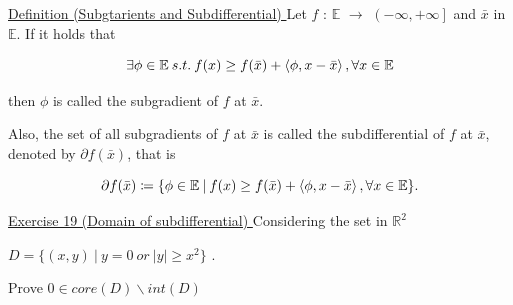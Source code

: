 \documentclass[a4paper,11pt]{jsarticle}
\begin{document}
\begin{itembox}[l]{\underline{Definition (Subgtarients and Subdifferential) }}
  Let $f$ : $\mathbb{E}$ $\to$ $ \left ( -\infty ,+\infty \right ] $ and $\bar{x}$ in $\mathbb{E}$. If it holds that

  \begin{equation}
    \exists \phi \in \mathbb{E} \:s.t.\: f(x) \geq f(\bar{x}) + \left\langle \phi, x-\bar{x} \right\rangle, \forall x \in \mathbb{E} \notag
  \end{equation}

  then $\phi$ is called the subgradient of $f$ at $\bar{x}$.

  Also, the set of all subgradients of $f$ at $\bar{x}$ is called the subdifferential of $f$ at $\bar{x}$, denoted by $\partial f(\bar{x})$, that is

  \begin{equation}
    \partial f(\bar{x}) \coloneqq \{\phi \in \mathbb{E}\:|\:f(x) \geq f(\bar{x}) + \left\langle \phi, x-\bar{x} \right\rangle, \forall x \in \mathbb{E} \}. \notag
  \end{equation}
\end{itembox}

\begin{itembox}[l]{\underline{Exercise 19 (Domain of subdifferential) }}
  Considering the set in $\mathbb{R}^2$

  \begin{center}
    $D=\{(x,y) \:|\: y = 0 \:or\: |y| \geq x^2 \}$ .
  \end{center}

  Prove $0 \in core (D) \backslash int (D) $
\end{itembox}
\end{document}
